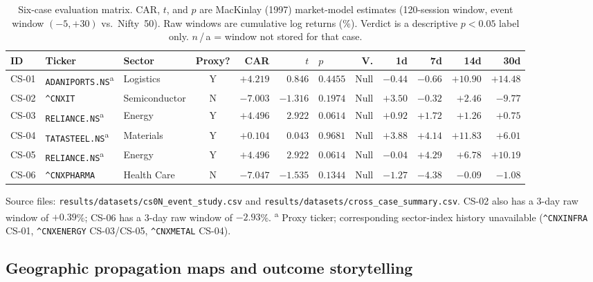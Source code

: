\documentclass[10pt,a4paper,twocolumn]{article}
\newcommand{\CAR}{\mathrm{CAR}}
\begin{document}
\begin{table}[t]
\centering
\caption{Six-case evaluation matrix. $\CAR$, $t$, and $p$ are MacKinlay (1997) market-model estimates (120-session window, event window $(-5,+30)$ vs.\ Nifty~50). Raw windows are cumulative log returns (\%). Verdict is a descriptive $p<0.05$ label only. $n$\,/\,a = window not stored for that case.}
\label{tab:evalmatrix}
\small
\begin{tabular}{@{}lllcrrlrrrrr@{}}
\toprule
\textbf{ID} & \textbf{Ticker} & \textbf{Sector} & \textbf{Proxy?} & \textbf{CAR} & \textbf{$t$} & \textbf{$p$} & \textbf{V.} & \textbf{1d} & \textbf{7d} & \textbf{14d} & \textbf{30d} \\
\midrule
CS-01 & \texttt{ADANIPORTS.NS}\textsuperscript{a} & Logistics & Y & $+4.219$ & $0.846$ & $0.4455$ & Null & $-0.44$ & $-0.66$ & $+10.90$ & $+14.48$ \\
CS-02 & \texttt{\^{}CNXIT} & Semiconductor & N & $-7.003$ & $-1.316$ & $0.1974$ & Null & $+3.50$ & $-0.32$ & $+2.46$ & $-9.77$ \\
CS-03 & \texttt{RELIANCE.NS}\textsuperscript{a} & Energy & Y & $+4.496$ & $2.922$ & $0.0614$ & Null & $+0.92$ & $+1.72$ & $+1.26$ & $+0.75$ \\
CS-04 & \texttt{TATASTEEL.NS}\textsuperscript{a} & Materials & Y & $+0.104$ & $0.043$ & $0.9681$ & Null & $+3.88$ & $+4.14$ & $+11.83$ & $+6.01$ \\
CS-05 & \texttt{RELIANCE.NS}\textsuperscript{a} & Energy & Y & $+4.496$ & $2.922$ & $0.0614$ & Null & $-0.04$ & $+4.29$ & $+6.78$ & $+10.19$ \\
CS-06 & \texttt{\^{}CNXPHARMA} & Health Care & N & $-7.047$ & $-1.535$ & $0.1344$ & Null & $-1.27$ & $-4.38$ & $-0.09$ & $-1.08$ \\
\bottomrule
\end{tabular}

\smallskip
\footnotesize Source files: \texttt{results/datasets/cs0N\_event\_study.csv} and \texttt{results/datasets/cross\_case\_summary.csv}.
CS-02 also has a 3-day raw window of $+0.39$\%; CS-06 has a 3-day raw window of $-2.93$\%.
\textsuperscript{a} Proxy ticker; corresponding sector-index history unavailable
(\texttt{\^{}CNXINFRA} CS-01, \texttt{\^{}CNXENERGY} CS-03/CS-05, \texttt{\^{}CNXMETAL} CS-04).
\end{table}

\clearpage
\subsection{Geographic propagation maps and outcome storytelling}\label{sec:propmap}
\end{document}
